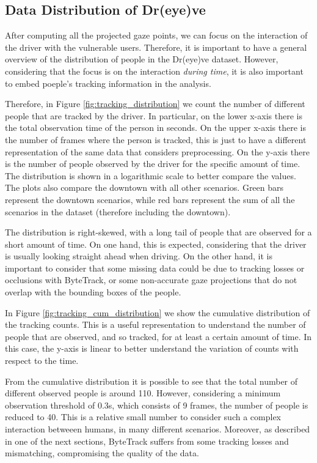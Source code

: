\subsection{Data Distribution of Dr(eye)ve}
After computing all the projected gaze points, we can focus on the interaction 
of the driver with the vulnerable users. Therefore, it is important to have 
a general overview of the distribution of people in the Dr(eye)ve dataset.
However, considering that the focus is on the interaction \emph{during time},
it is also important to embed poeple's tracking information in the analysis.

Therefore, in Figure \ref{fig:tracking_distribution} we count the number of 
different people that are tracked by the driver. In particular, on the lower 
x-axis there is the total observation time of the person in seconds. On the 
upper x-axis there is the number of frames where the person is tracked, this is 
just to have a different representation of the same data that considers 
preprocessing. On the y-axis there is the number of people observed by the driver 
for the specific amount of time. The distribution is shown in a logarithmic scale 
to better compare the values.
The plots also compare the downtown with all other scenarios. Green bars 
represent the downtown scenarios, while red bars represent the sum of all 
the scenarios in the dataset (therefore including the downtown).

The distribution is right-skewed, with a long tail of people that are observed 
for a short amount of time.
On one hand, this is expected, considering that the driver is usually looking 
straight ahead when driving. On the other hand, it is important to consider 
that some missing data could be due to tracking losses or occlusions with 
ByteTrack, or some non-accurate gaze projections that do not overlap with the 
bounding boxes of the people.

In Figure \ref{fig:tracking_cum_distribution} we show the cumulative distribution 
of the tracking counts. This is a useful representation to understand the number 
of people that are observed, and so tracked, for at least a certain amount of time. 
In this case, the y-axis is linear to better understand the variation of counts 
with respect to the time.

From the cumulative distribution it is possible to see that the total number of 
different observed people is around 110. However, considering a minimum observation 
threshold of 0.3s, which consists of 9 frames, the number of people is reduced 
to 40.
This is a relative small number to consider such a complex interaction betweeen 
humans, in many different scenarios. Moreover, as described in one of the next 
sections, ByteTrack suffers from some tracking losses and mismatching, 
compromising the quality of the data.

